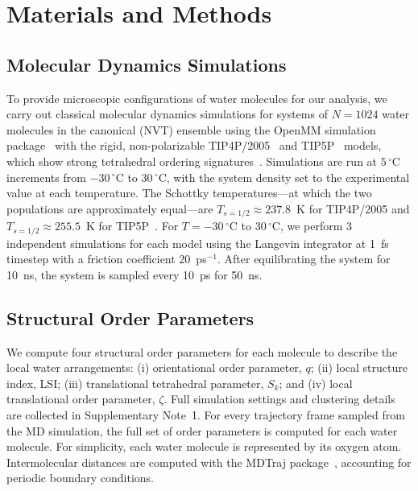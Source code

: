 \documentclass[aps, amsmath,amssymb, reprint, twocolumn, superscriptaddress]{revtex4-2}
\begin{document}
\FloatBarrier

\section{Materials and Methods}

\subsection{Molecular Dynamics Simulations}
To provide microscopic configurations of water molecules for our analysis, we carry out classical molecular dynamics simulations for systems of $N = 1024$ water molecules in the canonical (NVT) ensemble using the OpenMM simulation package~\cite{eastman_openmm_2015} with the rigid, non-polarizable TIP4P/2005~\cite{abascal_general_2005} and TIP5P~\cite{mahoney_five-site_2000} models, which show strong tetrahedral ordering signatures~\cite{shi_direct_2020}. Simulations are run at $5\,^\circ$C increments from $-30\,^\circ$C to $30\,^\circ$C, with the system density set to the experimental value at each temperature. The Schottky temperatures---at which the two populations are approximately equal---are $T_{s=1/2} \approx 237.8$~K for TIP4P/2005 and $T_{s=1/2} \approx 255.5$~K for TIP5P~\cite{shi_direct_2020}. For $T=-30\,^\circ$C to $30\,^\circ$C, we perform 3 independent simulations for each model using the Langevin integrator at 1~fs timestep with a friction coefficient 20~ps$^{-1}$. After equilibrating the system for 10~ns, the system is sampled every 10~ps for 50~ns. 

\subsection{Structural Order Parameters}
\label{sec:structural_order_parameter}
We compute four structural order parameters for each molecule to describe the local water arrangements: (i) orientational order parameter, $q$; (ii) local structure index, LSI; (iii) translational tetrahedral parameter, $S_k$; and (iv) local translational order parameter, $\zeta$. Full simulation settings and clustering details are collected in Supplementary Note~1. For every trajectory frame sampled from the MD simulation, the full set of order parameters is computed for each water molecule. For simplicity, each water molecule is represented by its oxygen atom. Intermolecular distances are computed with the MDTraj package~\cite{mcgibbon_mdtraj_2015}, accounting for periodic boundary conditions.
\end{document}
